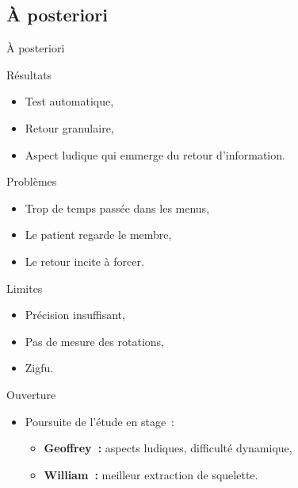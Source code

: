 \subsection{À posteriori}
\begin{frame}{À posteriori}
{
  \begin{block}{Résultats}
  \begin{itemize}
  \item Test automatique,
  \item Retour granulaire,
  \item Aspect ludique qui emmerge du retour d'information.
  \end{itemize}
  \end{block}
}
{
  \begin{alertblock}{Problèmes}
  \begin{itemize}
  \item Trop de temps passée dans les menus,
  \item Le patient regarde le membre,
  \item Le retour incite à forcer.
  \end{itemize}
  \end{alertblock}
}
{
  \begin{alertblock}{Limites}
  \begin{itemize}
  \item Précision insuffisant,
  \item Pas de mesure des rotations,
  \item Zigfu.
  \end{itemize}
  \end{alertblock}
}
{
  \begin{block}{Ouverture}
  \begin{itemize}
  \item Poursuite de l'étude en stage~:
  \begin{itemize}
  \item \textbf{Geoffrey~:} aspects ludiques, difficulté dynamique,
  \item \textbf{William~:} meilleur extraction de squelette. 
  \end{itemize}
  \end{itemize}
  \end{block}
}

\end{frame}